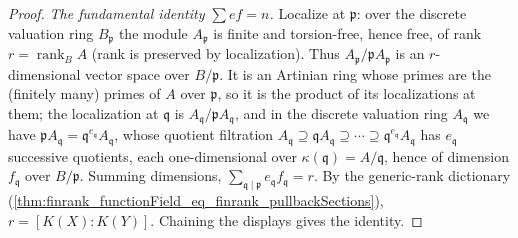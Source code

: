 \begin{proof}
  \emph{The fundamental identity \(\sum e f = n\).} Localize at \(\mathfrak p\): over
  the discrete valuation ring \(B_{\mathfrak p}\) the module \(A_{\mathfrak p}\) is
  finite and torsion-free, hence free, of rank
  \(r = \operatorname{rank}_B A\) (rank is preserved by localization). Thus
  \(A_{\mathfrak p}/\mathfrak p A_{\mathfrak p}\) is an \(r\)-dimensional vector space
  over \(B/\mathfrak p\). It is an Artinian ring whose primes are the (finitely many)
  primes of \(A\) over \(\mathfrak p\), so it is the product of its localizations at
  them; the localization at \(\mathfrak q\) is
  \(A_{\mathfrak q}/\mathfrak p A_{\mathfrak q}\), and in the discrete valuation ring
  \(A_{\mathfrak q}\) we have \(\mathfrak p A_{\mathfrak q} =
  \mathfrak q^{e_{\mathfrak q}} A_{\mathfrak q}\), whose quotient filtration
  \(A_{\mathfrak q} \supseteq \mathfrak q A_{\mathfrak q} \supseteq \cdots \supseteq
  \mathfrak q^{e_{\mathfrak q}} A_{\mathfrak q}\) has \(e_{\mathfrak q}\) successive
  quotients, each one-dimensional over \(\kappa(\mathfrak q) = A/\mathfrak q\), hence
  of dimension \(f_{\mathfrak q}\) over \(B/\mathfrak p\). Summing dimensions,
  \(\sum_{\mathfrak q \mid \mathfrak p} e_{\mathfrak q} f_{\mathfrak q} = r\). By the
  generic-rank dictionary
  (\ref{thm:finrank_functionField_eq_finrank_pullbackSections}),
  \(r = [K(X) : K(Y)]\). Chaining the displays gives the identity.
\end{proof}

